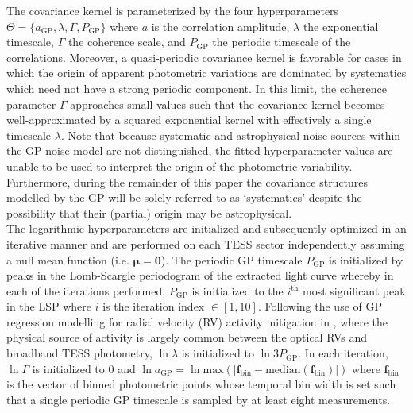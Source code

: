 \noindent The covariance kernel is parameterized by the four hyperparameters
$\Theta=\{a_{\text{GP}},\lambda,\Gamma,P_{\text{GP}}\}$ where
$a$ is the correlation amplitude, $\lambda$ the exponential timescale, $\Gamma$ the coherence scale,
and $P_{\text{GP}}$ the periodic timescale of the correlations. Moreover,
a quasi-periodic covariance kernel is favorable for cases in which the origin of
apparent photometric variations are dominated by systematics which need not have a strong periodic
component. In this limit, the coherence parameter $\Gamma$ approaches small values such
that the covariance kernel becomes well-approximated by a squared exponential kernel with effectively a
single timescale $\lambda$. Note that because 
systematic and astrophysical noise sources within the GP noise model are not distinguished,
the fitted hyperparameter values are unable to be used to interpret the origin of the photometric
variability. Furthermore, during the remainder of this paper the covariance structures modelled by the
GP will be solely referred to as `systematics' despite the possibility that their (partial) origin may
be astrophysical. \\

The logarithmic hyperparameters are initialized and subsequently optimized in an iterative manner and
are performed on each TESS sector independently assuming a null mean function (i.e.
$\boldsymbol{\mu}=\mathbf{0}$).
The periodic GP timescale $P_{\text{GP}}$ is initialized by peaks in the Lomb-Scargle
periodogram \citep[LSP;][]{scargle82} of the extracted light curve whereby in each of the iterations
performed, $P_{\text{GP}}$ is initialized to the $i^{\text{th}}$ most significant peak in the LSP where $i$
is the iteration index $\in [1,10]$.
Following the use of GP regression
modelling for radial velocity (RV) activity mitigation in \cite{dittmann17a}, where the physical source of
activity is largely common between the optical RVs and broadband TESS photometry,  
$\ln{\lambda}$ is initialized to $\ln{3P_{\text{GP}}}$. In each iteration, $\ln{\Gamma}$ is initialized to
$0$ and $\ln{a_{\text{GP}}}=\ln{\text{max}(|\mathbf{f}_{\text{bin}} - \text{median}(\mathbf{f}_{\text{bin}})|)}$
where $\mathbf{f}_{\text{bin}}$ is the vector of binned photometric points whose temporal bin width is set
such that a single periodic GP timescale is sampled by at least eight measurements. \\

